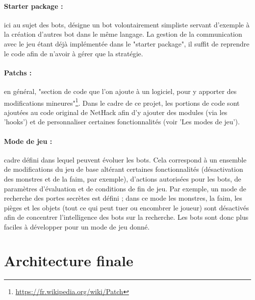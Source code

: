 \documentclass[a4paper,12pt]{article}
\begin{document}
\paragraph{Starter package :}ici au sujet des bots, désigne un bot volontairement
simpliste servant d'exemple à la création d'autres bot dans le même langage.
La gestion de la communication avec le jeu étant déjà implémentée dans le
"starter package", il suffit de reprendre le code afin de n'avoir à gérer que
la stratégie.

\paragraph{Patchs :}en général, "section de code que l'on ajoute à un
logiciel, pour y apporter des modifications
mineures"\footnote{\url{https://fr.wikipedia.org/wiki/Patch}}. Dans le cadre
de ce projet, les portions de code sont ajoutées au code original de NetHack
afin d'y ajouter des modules (via les 'hooks') et de personnaliser certaines
fonctionnalités (voir 'Les modes de jeu').

\paragraph{Mode de jeu :}cadre défini dans lequel peuvent évoluer les bots.
Cela correspond à un ensemble de modifications du jeu de base altérant
certaines fonctionnalités (désactivation des monstres et de la faim, par
exemple), d'actions autorisées pour les bots, de paramètres d'évaluation et de
conditions de fin de jeu.
Par exemple, un mode de recherche des portes secrètes est défini ; dans ce
mode les monstres, la faim, les pièges et les objets (tout ce qui peut tuer ou
encombrer le joueur) sont désactivés afin de concentrer l'intelligence des
bots sur la recherche. Les bots sont donc plus faciles à développer pour un
mode de jeu donné.

\section{Architecture finale}
\end{document}
